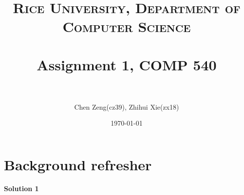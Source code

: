 \documentclass[paper=a4, fontsize=11pt]{scrartcl} %
\title{	
\normalfont \normalsize
\textsc{Rice University, Department of Computer Science} \\ [25pt] %
\horrule{0.5pt} \\[0.4cm] %
\huge Assignment 1, COMP 540 \\ %
\horrule{2pt} \\[0.5cm] %
}
\author{Chen Zeng(cz39), Zhihui Xie(zx18)} %
\date{\normalsize\today} %
\numberwithin{equation}{section} %
\numberwithin{figure}{section} %
\numberwithin{table}{section} %
\begin{document}
\maketitle %


\section{Background refresher}

\paragraph{\textbf{Solution 1}}
\end{document}
